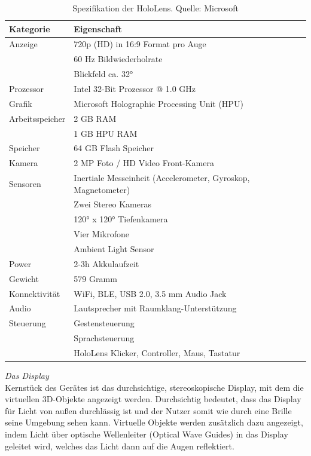 \bgroup
\setlength\extrarowheight{-2pt}
\def\arraystretch{2}
\begin{table}[H]
	\centering
	\begin{tabular}{l|l}
		Kategorie & Eigenschaft\\
		\hline
		Anzeige & 720p (HD) in 16:9 Format pro Auge\\
		& 60 Hz Bildwiederholrate\\
		& Blickfeld ca. 32°\\
		Prozessor & Intel 32-Bit Prozessor @ 1.0 GHz\\
		Grafik & Microsoft Holographic Processing Unit (HPU)\\
		Arbeitsspeicher & 2 GB RAM\\
		& 1 GB HPU RAM\\
		Speicher & 64 GB Flash Speicher\\
		Kamera & 2 MP Foto / HD Video Front-Kamera\\
		Sensoren & Inertiale Messeinheit (Accelerometer, Gyroskop, Magnetometer) \\
		& Zwei Stereo Kameras\\
		& 120° x 120° Tiefenkamera\\
		& Vier Mikrofone\\
		& Ambient Light Sensor\\
		Power & 2-3h Akkulaufzeit \\
		Gewicht & 579 Gramm \\
		Konnektivität & WiFi, BLE, USB 2.0, 3.5 mm Audio Jack \\
		Audio & Lautsprecher mit Raumklang-Unterstützung\\
		Steuerung & Gestensteuerung\\
		& Sprachsteuerung\\
		& HoloLens Klicker, Controller, Maus, Tastatur\\
	\end{tabular}\caption{\label{tab:hololens_tech_details} Spezifikation der HoloLens. Quelle: Microsoft}
\end{table}
\egroup

\vspace{4px}
\textit{Das Display}\\
Kernstück des Gerätes ist das durchsichtige, stereoskopische Display, mit dem die virtuellen 3D-Objekte angezeigt werden. Durchsichtig bedeutet, dass das Display für Licht von außen durchlässig ist und der Nutzer somit wie durch eine Brille seine Umgebung sehen kann. Virtuelle Objekte werden zusätzlich dazu angezeigt, indem Licht über optische Wellenleiter (Optical Wave Guides) in das Display geleitet wird, welches das Licht dann auf die Augen reflektiert.\\

